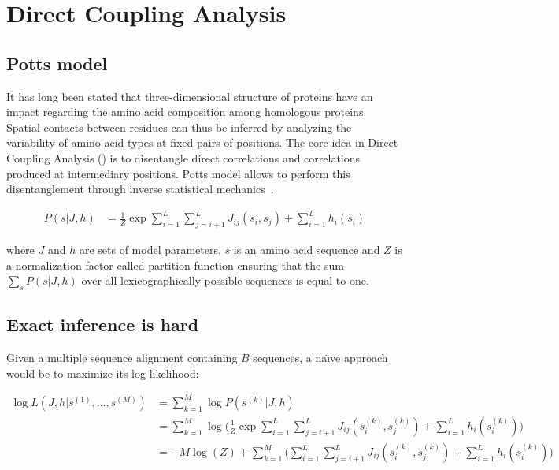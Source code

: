 \section{Direct Coupling Analysis}

    \subsection{Potts model} \label{potts}

        It has long been stated that three-dimensional structure of proteins
        have an impact regarding the amino acid composition among
        homologous proteins. Spatial contacts between residues can thus be inferred
        by analyzing the variability of amino acid types at fixed pairs of positions.
        The core idea in Direct Coupling Analysis () is to disentangle direct
        correlations and correlations produced at intermediary positions.
        Potts model allows to perform this disentanglement through inverse
        statistical mechanics~\cite{PhysRevE.87.012707}.

        \begin{equation}
            \begin{split}
                P(s \vert J, h) & = \frac{1}{Z} \exp{\sum\limits_{i=1}^L \sum\limits_{j=i+1}^L J_{ij}(s_i, s_j) + \sum\limits_{i=1}^L h_i(s_i)}
            \end{split}
        \end{equation}

        where $J$ and $h$ are sets of model parameters, $s$ is an amino acid sequence and
        $Z$ is a normalization factor called partition function ensuring
        that the sum $\sum\limits_{s} P(s \vert J, h)$ over all lexicographically
        possible sequences is equal to one.

    \subsection{Exact inference is hard}

        Given a multiple sequence alignment containing $B$ sequences, a na\"\i ve approach would be to maximize its log-likelihood:

        \begin{equation}
            \begin{split}
                \log{L}(J, h \vert s^{(1)}, \dotsc, s^{(M)}) & = \sum\limits_{k=1}^M \log P(s^{(k)} \vert J, h) \\
                & = \sum\limits_{k=1}^M \log \Bigg( \frac{1}{Z} \exp{\sum\limits_{i=1}^L 
                    \sum\limits_{j=i+1}^L J_{ij}(s_i^{(k)}, s_j^{(k)}) + \sum\limits_{i=1}^L h_i(s_i^{(k)})} \Bigg) \\
                & = -M \log(Z) + \sum\limits_{k=1}^M \Big( \sum\limits_{i=1}^L \sum\limits_{j=i+1}^L J_{ij}(s_i^{(k)}, s_j^{(k)}) 
                    + \sum\limits_{i=1}^L h_i(s_i^{(k)}) \Big)
            \end{split}
        \end{equation}

